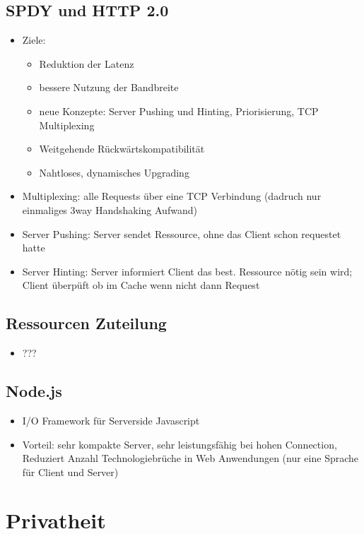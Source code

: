 \documentclass{article} %
\begin{document}
	\subsection{SPDY und HTTP 2.0}
	\begin{itemize}
		\item Ziele:
		\begin{itemize}
			\item Reduktion der Latenz
			\item bessere Nutzung der Bandbreite
			\item neue Konzepte: Server Pushing und Hinting, Priorisierung, TCP Multiplexing
			\item Weitgehende Rückwärtskompatibilität
			\item Nahtloses, dynamisches Upgrading
		\end{itemize}
		\item Multiplexing: alle Requests über eine TCP Verbindung (dadruch nur einmaliges 3way Handshaking Aufwand)
		\item Server Pushing: Server sendet Ressource, ohne das Client schon requestet hatte
		\item Server Hinting: Server informiert Client das best. Ressource nötig sein wird; Client überpüft ob im Cache wenn nicht dann Request
	\end{itemize}
	\subsection{Ressourcen Zuteilung}
	\begin{itemize}
		\item ???
	\end{itemize}
	\subsection{Node.js}
	\begin{itemize}
		\item I/O Framework für Serverside Javascript
		\item Vorteil: sehr kompakte Server, sehr leistungsfähig bei hohen Connection, Reduziert Anzahl Technologiebrüche in Web Anwendungen (nur eine Sprache für Client und Server)
	\end{itemize}
\section{Privatheit}
\end{document}
